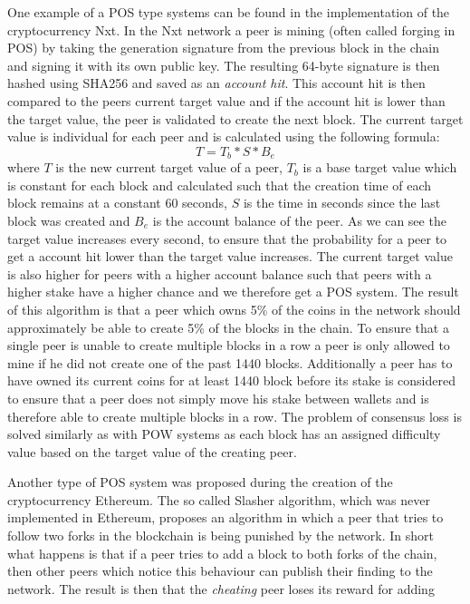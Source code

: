 One example of a POS type systems can be found in the implementation of the cryptocurrency Nxt. In the Nxt network a peer is mining (often called forging in POS) by taking the generation signature
from the previous block in the chain and signing it with its own public key. The resulting 64-byte signature is then hashed using SHA256 and saved as an \textit{account hit}. This account hit is then
compared to the peers current target value and if the account hit is lower than the target value, the peer is validated to create the next block. The current target value is individual for each peer
and is calculated using the following formula: $$T=T_b*S*B_e$$ where $T$ is the new current target value of a peer, $T_b$ is a base target value which is constant for each block and calculated such
that the creation time of each block remains at a constant 60 seconds, $S$ is the time in seconds since the last block was created and $B_e$ is the account balance of the peer. As we can see the
target value increases every second, to ensure that the probability for a peer to get a account hit lower than the target value increases. The current target value is also higher for peers with a
higher account balance such that peers with a higher stake have a higher chance and we therefore get a POS system. The result of this algorithm is that a peer which owns 5\% of the coins in the
network should approximately be able to create 5\% of the blocks in the chain. To ensure that a single peer is unable to create multiple blocks in a row a peer is only allowed to mine if he did not
create one of the past 1440 blocks. Additionally a peer has to have owned its current coins for at least 1440 block before its stake is considered to ensure that a peer does not simply move his stake
between wallets and is therefore able to create multiple blocks in a row. The problem of consensus loss is solved similarly as with POW systems as each block has an assigned difficulty value based on
the target value of the creating peer.\cite{url:nxt}\par Another type of POS system was proposed during the creation of the cryptocurrency Ethereum. The so called Slasher algorithm, which was never
implemented in Ethereum, proposes an algorithm in which a peer that tries to follow two forks in the blockchain is being punished by the network. In short what happens is that if a peer tries to add a
block to both forks of the chain, then other peers which notice this behaviour can publish their finding to the network. The result is then that the \textit{cheating} peer loses its reward for adding
